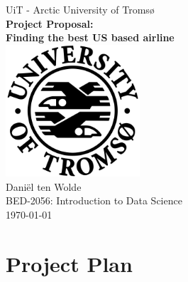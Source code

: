 \documentclass[11pt,oneside]{book}
\begin{document}
\frontmatter

\begin{titlepage}
	
	\begin{center}
		{\LARGE UiT - Arctic University of Troms\o}\\[1.5cm]
		\linespread{1.2}\huge {\bfseries Project Proposal: \\ Finding the best US based airline}\\[1.5cm]
		\linespread{1}
		\includegraphics[width=5cm]{logo1.png}\\[1cm]
		{\Large Dani\"el ten Wolde}\\[1cm]
		BED-2056: Introduction to Data Science\\[2cm]
		\today
	\end{center}
	
\end{titlepage}

\chapter{Project Plan}
\end{document}

